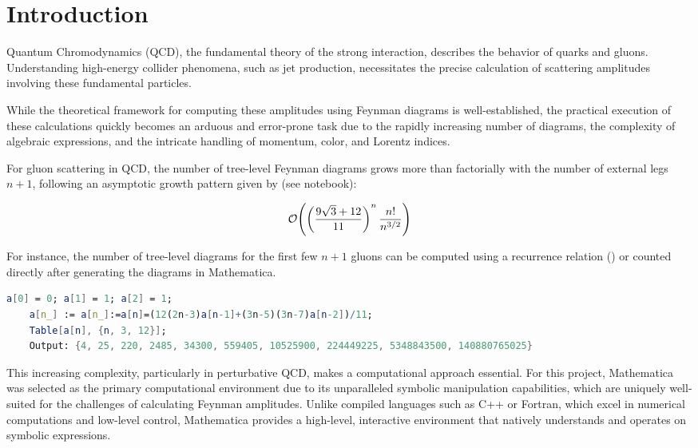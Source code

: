 \documentclass[main.tex]{subfiles}
\begin{document}
\section{Introduction}
\setcounter{page}{1}

Quantum Chromodynamics (QCD), the fundamental theory of the strong interaction, describes the behavior of quarks and gluons. 
Understanding high-energy collider phenomena, such as jet production, necessitates the precise calculation of scattering amplitudes 
involving these fundamental particles. 

While the theoretical framework for computing these amplitudes using Feynman diagrams is well-established, 
the practical execution of these calculations quickly becomes an arduous and error-prone task due to the rapidly increasing number of diagrams, 
the complexity of algebraic expressions, and the intricate handling of momentum, color, and Lorentz indices.

For gluon scattering in QCD, the number of tree-level Feynman diagrams grows more than factorially with the number of external legs $n+1$, 
following an asymptotic growth pattern given by (see notebook):

\begin{equation}
    \order{\left(\frac{9 \sqrt{3}+12}{11} \right)^n \frac{n!}{n^{3/2}}}   
\end{equation}

For instance, the number of tree-level diagrams for the first few $n+1$ gluons can be computed using a recurrence relation () 
or counted directly after generating the diagrams in Mathematica.

\begin{lstlisting}[language=Mathematica,caption = {Number of tree-level diagrams for $n+1$ gluons}, label = {lst:tree-diagrams}]
    a[0] = 0; a[1] = 1; a[2] = 1;
    a[n_] := a[n_]:=a[n]=(12(2n-3)a[n-1]+(3n-5)(3n-7)a[n-2])/11;
    Table[a[n], {n, 3, 12}];
    Output: {4, 25, 220, 2485, 34300, 559405, 10525900, 224449225, 5348843500, 140880765025}
\end{lstlisting}

This increasing complexity, particularly in perturbative QCD, makes a computational approach essential.
For this project, Mathematica \cite{Mathematica} was selected as the primary computational environment due to its unparalleled symbolic manipulation capabilities, which are uniquely well-suited 
for the challenges of calculating Feynman amplitudes. Unlike compiled languages such as C++ or Fortran, which excel in numerical computations and low-level 
control, Mathematica provides a high-level, interactive environment that natively understands and operates on symbolic expressions.
\end{document}
